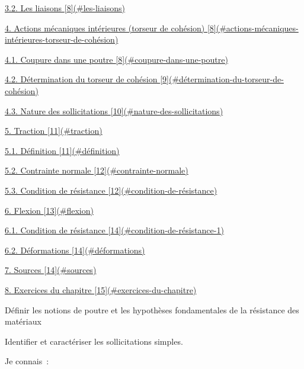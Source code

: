 \protect\hyperlink{les-liaisons}{3.2. Les liaisons {[}8{]}(\#les-liaisons)}

\protect\hyperlink{actions-muxe9caniques-intuxe9rieures-torseur-de-cohuxe9sion}{4. Actions mécaniques intérieures (torseur de cohésion) {[}8{]}(\#actions-mécaniques-intérieures-torseur-de-cohésion)}

\protect\hyperlink{coupure-dans-une-poutre}{4.1. Coupure dans une poutre {[}8{]}(\#coupure-dans-une-poutre)}

\protect\hyperlink{duxe9termination-du-torseur-de-cohuxe9sion}{4.2. Détermination du torseur de cohésion {[}9{]}(\#détermination-du-torseur-de-cohésion)}

\protect\hyperlink{nature-des-sollicitations}{4.3. Nature des sollicitations {[}10{]}(\#nature-des-sollicitations)}

\protect\hyperlink{traction}{5. Traction {[}11{]}(\#traction)}

\protect\hyperlink{duxe9finition}{5.1. Définition {[}11{]}(\#définition)}

\protect\hyperlink{contrainte-normale}{5.2. Contrainte normale {[}12{]}(\#contrainte-normale)}

\protect\hyperlink{condition-de-ruxe9sistance}{5.3. Condition de résistance {[}12{]}(\#condition-de-résistance)}

\protect\hyperlink{flexion}{6. Flexion {[}13{]}(\#flexion)}

\protect\hyperlink{condition-de-ruxe9sistance-1}{6.1. Condition de résistance {[}14{]}(\#condition-de-résistance-1)}

\protect\hyperlink{duxe9formations}{6.2. Déformations {[}14{]}(\#déformations)}

\protect\hyperlink{sources}{7. Sources {[}14{]}(\#sources)}

\protect\hyperlink{exercices-du-chapitre}{8. Exercices du chapitre {[}15{]}(\#exercices-du-chapitre)}

Définir les notions de poutre et les hypothèses fondamentales de la résistance des matériaux

Identifier et caractériser les sollicitations simples.

Je connais~:

